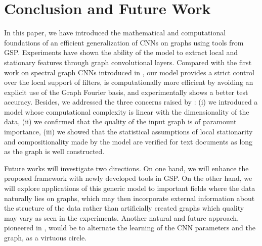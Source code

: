 \documentclass{article}
\begin{document}
\section{Conclusion and Future Work}

In this paper, we have introduced the mathematical and computational
foundations of an efficient generalization of CNNs on graphs using tools from
GSP. Experiments have shown the ability of the model to extract local and
stationary features through graph convolutional layers. Compared with the first
work on spectral graph CNNs introduced in \cite{art:BrunaZarembaSzlamLeCun13DLgraphs}, our model provides a
strict control over the local support of filters, is computationally more
efficient by avoiding an explicit use of the Graph Fourier basis, and
experimentally shows a better test accuracy. Besides, we addressed the three
concerns raised by \cite{art:HenaffBrunaLeCun15DLgraphs}: (i) we introduced a
model whose computational complexity is linear with the dimensionality of the
data, (ii) we confirmed that the quality of the input graph is of paramount
importance, (iii) we showed that the statistical assumptions of local
stationarity and compositionality made by the model are verified for text
documents as long as the graph is well constructed.

Future works will investigate two directions. On one hand, we will enhance the
proposed framework with newly developed tools in GSP. On the other hand, we
will explore applications of this generic model to important fields where the
data naturally lies on graphs, which may then incorporate external information
about the structure of the data rather than artificially created graphs which
quality may vary as seen in the experiments. Another natural and future
approach, pioneered in \cite{art:HenaffBrunaLeCun15DLgraphs}, would be to
alternate the learning of the CNN parameters and the graph, as a virtuous
circle.


\end{document}
